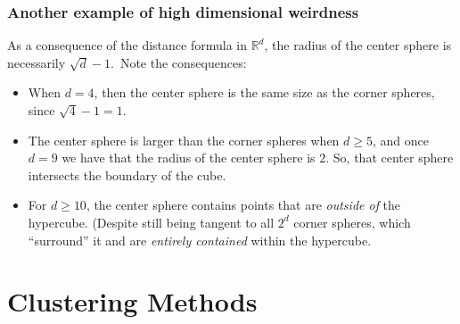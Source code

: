 \documentclass[smaller]{beamer}
\theoremstyle{example}
\begin{document}
\begin{frame}
    \frametitle{Another example of high dimensional weirdness}
    As a consequence of the distance formula in $\mathbb R^d$, the radius of the center sphere is necessarily $\sqrt{d} - 1$.\pause \ Note the consequences: 
    \begin{itemize}
        \item When $d=4$, then the center sphere is the same size as the corner spheres, since $\sqrt{4}-1 = 1$.
        \pause
        \item The center sphere is larger than the corner spheres when $d\ge 5$, and once $d = 9$ we have that the radius of the center sphere is $2$. So, that center sphere intersects the boundary of the cube.
        \pause
        \item For $d\ge 10$, the center sphere contains points that are \textit{outside of} the hypercube. (Despite still being tangent to all $2^d$ corner spheres, which ``surround'' it and are \textit{entirely contained} within the hypercube.
    \end{itemize}
\end{frame}

\section{Clustering Methods}
\end{document}
